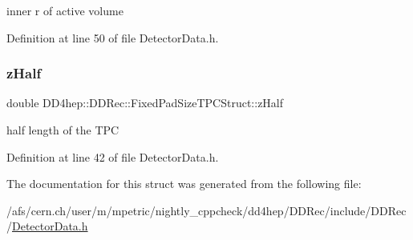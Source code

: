 inner r of active volume 



Definition at line 50 of file Detector\+Data.\+h.

\hypertarget{struct_d_d4hep_1_1_d_d_rec_1_1_fixed_pad_size_t_p_c_struct_a0985275f7d588c0b441a95ea09706328}{}\label{struct_d_d4hep_1_1_d_d_rec_1_1_fixed_pad_size_t_p_c_struct_a0985275f7d588c0b441a95ea09706328} 
\subsubsection{\texorpdfstring{z\+Half}{zHalf}}
{\footnotesize\ttfamily double D\+D4hep\+::\+D\+D\+Rec\+::\+Fixed\+Pad\+Size\+T\+P\+C\+Struct\+::z\+Half}



half length of the T\+PC 



Definition at line 42 of file Detector\+Data.\+h.



The documentation for this struct was generated from the following file\+:\begin{DoxyCompactItemize}
\item 
/afs/cern.\+ch/user/m/mpetric/nightly\+\_\+cppcheck/dd4hep/\+D\+D\+Rec/include/\+D\+D\+Rec/\hyperlink{_detector_data_8h}{Detector\+Data.\+h}\end{DoxyCompactItemize}
